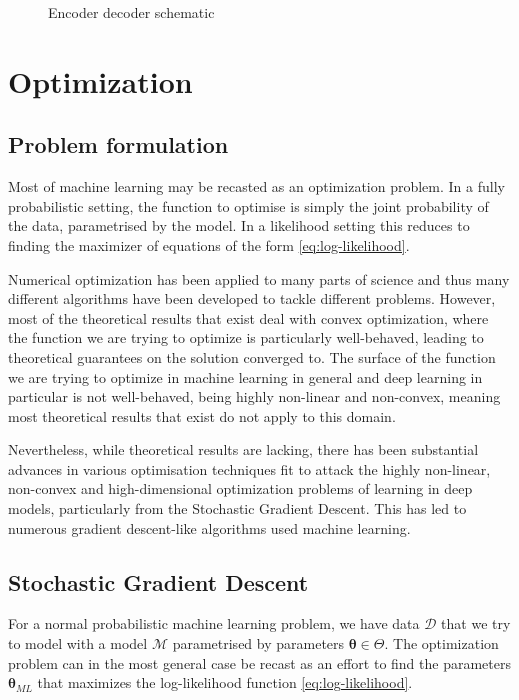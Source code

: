 \begin{figure}[H]
    \caption{Encoder decoder schematic}
  \label{fig:encoder_decoder}
\end{figure}

\section{Optimization}

\subsection{Problem formulation}

Most of machine learning may be recasted as an optimization problem. In a fully
probabilistic setting, the function to optimise is simply the joint probability
of the data, parametrised by the model. In a likelihood setting this reduces to
finding the maximizer of equations of the form \ref{eq:log-likelihood}.

Numerical optimization has been applied to many parts of science and thus many
different algorithms have been developed to tackle different problems. However,
most of the theoretical results that exist deal with convex optimization, where
the function we are trying to optimize is particularly well-behaved, leading to
theoretical guarantees on the solution converged to. The surface of the function
we are trying to optimize in machine learning in general and deep learning in
particular is not well-behaved, being highly non-linear and non-convex, meaning
most theoretical results that exist do not apply to this domain\cite{choromanska_loss_2014}.

Nevertheless, while theoretical results are lacking, there has been substantial
advances in various optimisation techniques fit to attack the highly non-linear,
non-convex and high-dimensional optimization problems of learning in deep
models, particularly from the Stochastic Gradient Descent. This has led to
numerous gradient descent-like algorithms used machine learning\cite{Ruder17}.

\subsection{Stochastic Gradient Descent}

For a normal probabilistic machine learning problem, we have data $\mathcal{D}$
that we try to model with a model $\mathcal{M}$ parametrised by parameters
$\bm{\theta} \in \Theta$. The optimization problem can in the most general case be recast
as an effort to find the parameters $\bm{\theta}_{ML}$ that maximizes the
log-likelihood function \ref{eq:log-likelihood}.

